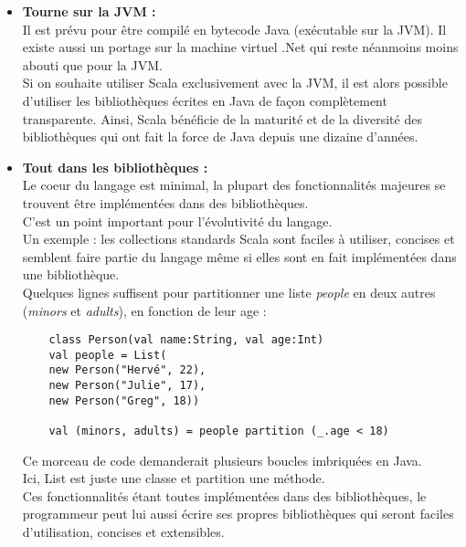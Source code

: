\begin{itemize}
\item[\textbullet]\textbf{Tourne sur la JVM :}\\
  Il est prévu pour être compilé en bytecode Java (exécutable sur la JVM).
  Il existe aussi un portage sur la machine virtuel .Net qui reste néanmoins
  moins abouti que pour la JVM.\\

  Si on souhaite utiliser Scala exclusivement avec la JVM, il est alors possible
  d'utiliser les bibliothèques écrites en Java de façon complètement
  transparente. Ainsi, Scala bénéficie de la maturité et de la diversité des
  bibliothèques qui ont fait la force de Java depuis une dizaine d'années.\\

\item[\textbullet]\textbf{Tout dans les bibliothèques :}\\
  Le coeur du langage est minimal, la plupart des fonctionnalités majeures se
  trouvent être implémentées dans des bibliothèques.\\
  C'est un point important pour l'évolutivité du langage.\\

  Un exemple : les collections standards Scala sont faciles à utiliser, concises
  et semblent faire partie du langage même si elles sont en fait implémentées
  dans une bibliothèque.\\
  Quelques lignes suffisent pour partitionner une liste \textit{people} en deux
  autres (\textit{minors} et \textit{adults}), en fonction de leur age :
\lstset{language=Scala}
\begin{lstlisting}
    class Person(val name:String, val age:Int)
    val people = List(
    new Person("Hervé", 22),
    new Person("Julie", 17),
    new Person("Greg", 18))

    val (minors, adults) = people partition (_.age < 18)
\end{lstlisting}

Ce morceau de code demanderait plusieurs boucles imbriquées en Java.\\
Ici, List est juste une classe et partition une méthode.\\
Ces fonctionnalités étant toutes implémentées dans des bibliothèques,
le programmeur peut lui aussi écrire ses propres bibliothèques qui seront
faciles d'utilisation, concises et extensibles.\\


\end{itemize}
